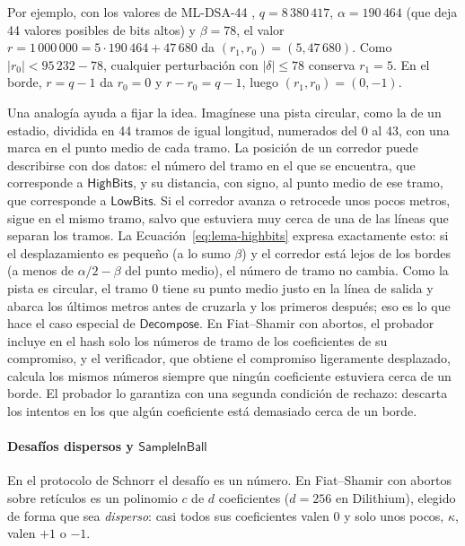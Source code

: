 Por ejemplo, con los valores de ML-DSA-44 \cite{nist2024fips204}, $q = 8\,380\,417$, $\alpha = 190\,464$ (que deja 44 valores posibles de bits altos) y $\beta = 78$, el valor $r = 1\,000\,000 = 5 \cdot 190\,464 + 47\,680$ da $(r_1, r_0) = (5, 47\,680)$. Como $|r_0| < 95\,232 - 78$, cualquier perturbación con $|\delta| \le 78$ conserva $r_1 = 5$. En el borde, $r = q - 1$ da $r_0 = 0$ y $r - r_0 = q - 1$, luego $(r_1, r_0) = (0, -1)$.

Una analogía ayuda a fijar la idea. Imagínese una pista circular, como la de un estadio, dividida en 44 tramos de igual longitud, numerados del 0 al 43, con una marca en el punto medio de cada tramo. La posición de un corredor puede describirse con dos datos: el número del tramo en el que se encuentra, que corresponde a $\mathsf{HighBits}$, y su distancia, con signo, al punto medio de ese tramo, que corresponde a $\mathsf{LowBits}$. Si el corredor avanza o retrocede unos pocos metros, sigue en el mismo tramo, salvo que estuviera muy cerca de una de las líneas que separan los tramos. La Ecuación~\eqref{eq:lema-highbits} expresa exactamente esto: si el desplazamiento es pequeño (a lo sumo $\beta$) y el corredor está lejos de los bordes (a menos de $\alpha/2 - \beta$ del punto medio), el número de tramo no cambia. Como la pista es circular, el tramo 0 tiene su punto medio justo en la línea de salida y abarca los últimos metros antes de cruzarla y los primeros después; eso es lo que hace el caso especial de $\mathsf{Decompose}$. En Fiat--Shamir con abortos, el probador incluye en el hash solo los números de tramo de los coeficientes de su compromiso, y el verificador, que obtiene el compromiso ligeramente desplazado, calcula los mismos números siempre que ningún coeficiente estuviera cerca de un borde. El probador lo garantiza con una segunda condición de rechazo: descarta los intentos en los que algún coeficiente está demasiado cerca de un borde.

\paragraph{Desafíos dispersos y $\mathsf{SampleInBall}$}
\label{sec:sampleinball}
En el protocolo de Schnorr el desafío es un número. En Fiat--Shamir con abortos sobre retículos es un polinomio $c$ de $d$ coeficientes ($d = 256$ en Dilithium), elegido de forma que sea \textit{disperso}: casi todos sus coeficientes valen $0$ y solo unos pocos, $\kappa$, valen $+1$ o $-1$.

